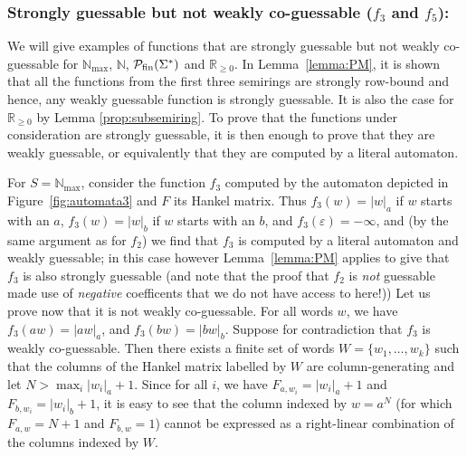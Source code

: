 \documentclass[10pt,a4paper]{amsart}
\theoremstyle{definition}
\numberwithin{equation}{section}
\numberwithin{theorem}{section}
\begin{document}
	\subsubsection*{\textbf{Strongly guessable but not weakly co-guessable ($f_3$ and $f_5$):}}
    \label{app:examplef3}
	We will give examples of functions that are strongly guessable but not weakly co-guessable for $\mathbb{N}_{\max}$, $\mathbb{N}$, $\mathcal{P}_{\rm fin}(\Sigma^*)$ and $\mathbb{R}_{\geq 0}$. In Lemma~\ref{lemma:PM}, it is shown that all the functions from the first three semirings are strongly row-bound and hence, any weakly guessable function is strongly guessable. It is also the case for $\mathbb{R}_{\geq 0}$ by Lemma \ref{prop:subsemiring}. To prove that the functions under consideration are strongly guessable, it is then enough to prove that they are weakly guessable, or equivalently that they are computed by a literal automaton. 
	
	For  $S=\mathbb{N}_{\max}$, consider the function $f_3$ computed by the automaton depicted in Figure~\ref{fig:automata3} and $F$ its Hankel matrix. Thus $f_3(w) = |w|_a$ if $w$ starts with an $a$, $f_3(w) = |w|_b$ if $w$ starts with an $b$, and $f_3(\varepsilon) = -\infty$, and (by the same argument as for $f_2$) we find that $f_3$ is computed by a literal automaton and weakly guessable; in this case however Lemma~\ref{lemma:PM}  applies to give that $f_3$ is also strongly guessable (and note that the proof that $f_2$ is \emph{not} guessable made use of \emph{negative} coefficents that we do not have access to here!)) Let us prove now that it is not weakly co-guessable. For all words $w$, we have $f_3(aw) = |aw|_a$, and $f_3(bw) = |bw|_b$. Suppose for contradiction that $f_3$ is weakly co-guessable. Then there exists a finite set of words $W=\{w_1, \ldots ,w_k\}$ such that the columns of the Hankel matrix labelled by $W$ are column-generating and let $N> \max_i|w_i|_a + 1$. Since for all $i$, we have $F_{a, w_i} = |w_i|_a + 1$ and $F_{b, w_i} = |w_i|_b+1$, it is easy to see that the column indexed by $w = a^N$ (for which $F_{a, w} = N+1$ and $F_{b, w} = 1$) cannot be expressed as a right-linear combination of the columns indexed by $W$.
	
\end{document}
